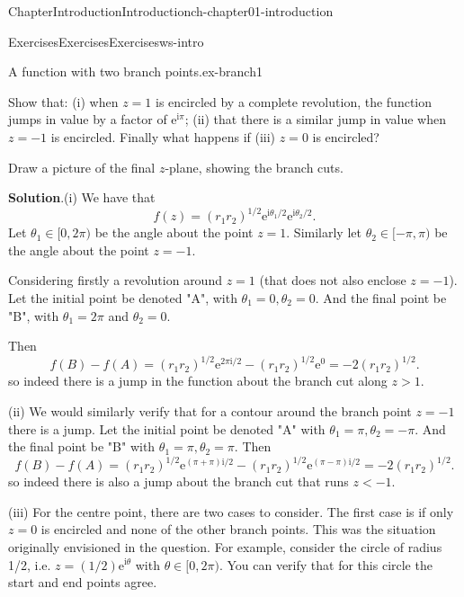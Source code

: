 \documentclass[oneside,10pt,]{book}
\newcommand{\blocktitlefont}{\relax}
\numberwithin{equation}{section}
\newcommand{\e}{\mathrm{e}}
\newcommand{\im}{\mathrm{i}}
\begin{document}
\begin{chapterptx}{Chapter}{Introduction}{}{Introduction}{}{}{ch-chapter01-introduction}
\begin{exercises-section}{Exercises}{Exercises}{}{Exercises}{}{}{ws-intro}
\begin{divisionexercise}{2}{A function with two branch points.}{}{ex-branch1}
\begin{enumerate}[font=\bfseries,label=(\alph*),ref=\alph*]
\par
Show that: (i) when \(z = 1\) is encircled by a complete revolution, the function jumps in value by a factor of \(\e^{\im \pi}\); (ii) that there is a similar jump in value when \(z = -1\) is encircled. Finally what happens if (iii) \(z = 0\) is encircled?%
\par
Draw a picture of the final \(z\)-plane, showing the branch cuts.%
\par\smallskip%
\noindent\textbf{\blocktitlefont Solution}.\hypertarget{ex-branch1-3-2}{}\quad{}(i) We have that%
\begin{equation*}
f(z) = (r_1 r_2)^{1/2} \e^{\im \theta_1/2} \e^{\im \theta_2/2}.
\end{equation*}
Let \(\theta_1 \in [0, 2\pi)\) be the angle about the point \(z = 1\). Similarly let \(\theta_2 \in [-\pi, \pi)\) be the angle about the point \(z = -1\).%
\par
Considering firstly a revolution around \(z = 1\) (that does not also enclose \(z = -1\)). Let the initial point be denoted "A", with \(\theta_1 = 0, \theta_2 = 0\). And the final point be "B", with \(\theta_1 = 2\pi\) and \(\theta_2 = 0\).%
\par
Then%
\begin{equation*}
f(B) - f(A) = (r_1 r_2)^{1/2} \e^{2\pi\im/2} - (r_1 r_2)^{1/2} \e^0 = -2(r_1 r_2)^{1/2}.
\end{equation*}
so indeed there is a jump in the function about the branch cut along \(z > 1\).%
\par
(ii) We would similarly verify that for a contour around the branch point \(z = -1\) there is a jump. Let the initial point be denoted "A" with \(\theta_1 = \pi, \theta_2 = -\pi\). And the final point be "B" with \(\theta_1 = \pi, \theta_2 = \pi\). Then%
\begin{equation*}
f(B) - f(A) = (r_1 r_2)^{1/2} \e^{(\pi + \pi)\im/2} - (r_1 r_2)^{1/2} \e^{(\pi - \pi)\im/2} = -2(r_1 r_2)^{1/2}.
\end{equation*}
so indeed there is also a jump about the branch cut that runs \(z < -1\).%
\par
(iii) For the centre point, there are two cases to consider. The first case is if only \(z = 0\) is encircled and none of the other branch points. This was the situation originally envisioned in the question. For example, consider the circle of radius 1\slash{}2, i.e. \(z = (1/2) \e^{\im \theta}\) with \(\theta \in [0, 2\pi)\). You can verify that for this circle the start and end points agree.%
\par

\end{enumerate}
\end{divisionexercise}
\end{exercises-section}
\end{chapterptx}
\end{document}
